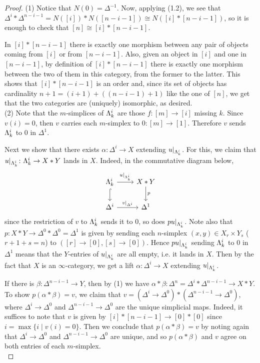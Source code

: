\documentclass[a4paper,11pt,openany]{scrartcl}
\begin{document}
\newpage
{}
\begin{proof}
    (1) Notice that $N(0)=\Delta^{-1}$. Now, applying (1.2), we see that
    $\Delta^i*\Delta^{n-i-1}=N([i])*N([n-i-1])\cong N([i]*[n-i-1])$, so it is
    enough to check that $[n]\cong [i]*[n-i-1]$.

    In $[i]*[n-i-1]$ there is exactly one morphism between any pair of objects
    coming from $[i]$ or from $[n-i-1]$. Also, given an object in $[i]$ and one
    in $[n-i-1]$, by definition of $[i]*[n-i-1]$ there is exactly one morphism
    between the two of them in this category, from the former to the latter.
    This shows that $[i]*[n-i-1]$ is an order and, since its set of objects has
    cardinality $n+1=(i+1)+((n-i-1)+1)$ like the one of $[n]$, we get that the
    two categories are (uniquely) isomorphic, as desired. \\

    (2) Note that the $m$-simplices of $\Lambda^i_k$ are those $f\colon[m]\to[i]$ missing $k$. Since $v(i)=0$, then $v$ carries each $m$-simplex to $0\colon[m]\to[1]$. Therefore $v$ sends $\Lambda^i_k$ to $0$ in $\Delta^1$.

Next we show that there exists $\alpha\colon\Delta^i\to X$ extending $u|_{\Lambda^i_k}$. For this, we claim that $u|_{\Lambda^i_k}\colon\Lambda^i_k\to X*Y$ lands in $X$. Indeed, in the commutative diagram below,
\[
\begin{tikzcd}
\La^i_k\arrow[r,"u|_{\Lambda^i_k}"]\arrow[d,hookrightarrow]& X*Y\arrow[d,"p"]\\
\Delta^i\arrow[r,"v|_{\Delta^i}"]& \Delta^1
\end{tikzcd}
\]
since the restriction of $v$ to $\Lambda^i_k$ sends it to $0$, so does $pu|_{\Lambda^i_k}$. Note also that $p\colon X*Y\to\Delta^0*\Delta^0=\Delta^1$ is given by sending each $n$-simplex $(x,y)\in X_r\times Y_s$ ($r+1+s=n$) to $([r]\to[0],[s]\to[0])$. Hence $pu|_{\Lambda^i_k}$ sending $\Lambda^i_k$ to $0$ in $\Delta^1$ means that the $Y$-entries of $u|_{\Lambda^i_k}$ are all empty, i.e. it lands in $X$. Then by the fact that $X$ is an $\infty$-category, we get a lift $\alpha\colon\Delta^i\to X$ extending $u|_{\Lambda^i_k}$.

If there is $\beta\colon\Delta^{n-i-1}\to Y$, then by (1) we have $\alpha*\beta\colon\Delta^n=\Delta^i*\Delta^{n-i-1}\to X*Y$. To show $p(\alpha*\beta)=v$, we claim that $v=(\Delta^i\to\Delta^0)*(\Delta^{n-i-1}\to\Delta^0)$, where $\Delta^i\to\Delta^0$ and $\Delta^{n-i-1}\to\Delta^0$ are the unique simplicial maps. Indeed, it suffices to note that  $v$ is given by $[i]*[n-i-1]\to[0]*[0]$ since $i=\max\{i\mid v(i)=0\}$. Then we conclude that $p(\alpha*\beta)=v$ by noting again that $\Delta^i\to\Delta^0$ and $\Delta^{n-i-1}\to\Delta^0$ are unique, and so $p(\alpha*\beta)$ and $v$ agree on both entries of each $m$-simplex.\\


\end{proof}
\end{document}
